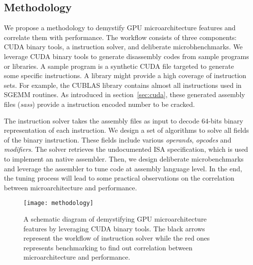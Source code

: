 \subsection{Methodology}
We propose a methodology to demystify GPU microarchitecture features and correlate them with performance. The workflow consists of three components: CUDA binary tools, a instruction solver, and deliberate microbhenchmarks. We leverage CUDA binary tools to generate disassembly codes from sample programs or libraries. A sample program is a synthetic CUDA file targeted to generate some specific instructions. A library might provide a high coverage of instruction sets. For example, the CUBLAS library contains almost all instructions used in SGEMM routines. As introduced in section~\ref{sec:cuda}, these generated assembly files ({\em sass}) provide a instruction encoded number to be cracked.

The instruction solver takes the assembly files as input to decode $64$-bits binary representation of each instruction. We design a set of algorithms to solve all fields of the binary instruction. These fields include various {\em operands}, {\em opcodes} and {\em modifiers}. The solver retrieves the undocumented ISA specification, which is used to implement an native assembler. Then, we design deliberate microbenchmarks and leverage the assembler to tune code at assembly language level. In the end, the tuning process will lead to some practical observations on the correlation between microarchitecture and performance.

\begin{figure}[htbp]
\begin{center}
\texttt{[image: methodology]}
\caption{A schematic diagram of demystifying GPU microarchitecture features by leveraging CUDA binary tools. The black arrows represent the workflow of instruction solver while the red ones represents benchmarking to find out correlation between microarchitecture and performance.}
\label{fig:workflow}
\end{center}
\end{figure}


